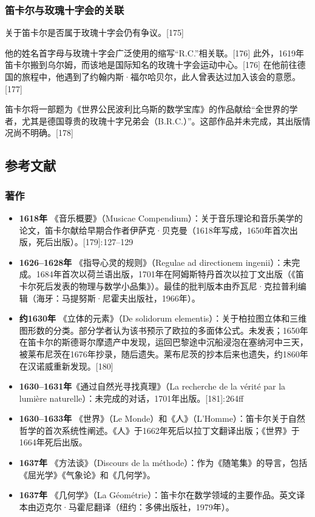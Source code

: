 \subsubsection{笛卡尔与玫瑰十字会的关联}
关于笛卡尔是否属于玫瑰十字会仍有争议。[175]

他的姓名首字母与玫瑰十字会广泛使用的缩写“R.C.”相关联。[176] 此外，1619年笛卡尔搬到乌尔姆，而该地是国际知名的玫瑰十字会运动中心。[176] 在他前往德国的旅程中，他遇到了约翰内斯·福尔哈贝尔，此人曾表达过加入该会的意愿。[177]

笛卡尔将一部题为《世界公民波利比乌斯的数学宝库》的作品献给“全世界的学者，尤其是德国尊贵的玫瑰十字兄弟会（B.R.C.）”。这部作品并未完成，其出版情况尚不明确。[178]
\subsection{参考文献}
\subsubsection{著作}

\begin{itemize}
\item \textbf{1618年} 《音乐概要》（Musicae Compendium）：关于音乐理论和音乐美学的论文，笛卡尔献给早期合作者伊萨克·贝克曼（1618年写成，1650年首次出版，死后出版）。[179]: 127–129 
\item \textbf{1626–1628年} 《指导心灵的规则》（Regulae ad directionem ingenii）：未完成。1684年首次以荷兰语出版，1701年在阿姆斯特丹首次以拉丁文出版（《笛卡尔死后发表的物理与数学小品集》）。最佳的批判版本由乔瓦尼·克拉普利编辑（海牙：马提努斯·尼霍夫出版社，1966年）。
\item \textbf{约1630年} 《立体的元素》（De solidorum elementis）：关于柏拉图立体和三维图形数的分类。部分学者认为该书预示了欧拉的多面体公式。未发表；1650年在笛卡尔的斯德哥尔摩遗产中发现，运回巴黎途中沉船浸泡在塞纳河中三天，被莱布尼茨在1676年抄录，随后遗失。莱布尼茨的抄本后来也遗失，约1860年在汉诺威重新发现。[180]
\item \textbf{1630–1631年}《通过自然光寻找真理》（La recherche de la vérité par la lumière naturelle）：未完成的对话，1701年出版。[181]: 264ff 
\item \textbf{1630–1633年} 《世界》（Le Monde）和《人》（L'Homme）：笛卡尔关于自然哲学的首次系统性阐述。《人》于1662年死后以拉丁文翻译出版；《世界》于1664年死后出版。
\item \textbf{1637年} 《方法谈》（Discours de la méthode）：作为《随笔集》的导言，包括《屈光学》《气象论》和《几何学》。
\item \textbf{1637年} 《几何学》（La Géométrie）：笛卡尔在数学领域的主要作品。英文译本由迈克尔·马霍尼翻译（纽约：多佛出版社，1979年）。
\end{itemize}